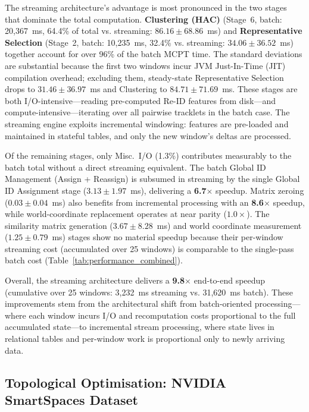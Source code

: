 \documentclass[review]{elsarticle}
\begin{document}
The streaming architecture's advantage is most pronounced in the two stages that dominate the total computation. \textbf{Clustering (HAC)} (Stage~6, batch: 20,367~ms, 64.4\% of total vs. streaming: $86.16 \pm 68.86$~ms) and \textbf{Representative Selection} (Stage~2, batch: 10,235~ms, 32.4\% vs. streaming: $34.06 \pm 36.52$~ms) together account for over 96\% of the batch MCPT time. The standard deviations are substantial because the first two windows incur JVM Just-In-Time (JIT) compilation overhead; excluding them, steady-state Representative Selection drops to $31.46 \pm 36.97$~ms and Clustering to $84.71 \pm 71.69$~ms. These stages are both I/O-intensive---reading pre-computed Re-ID features from disk---and compute-intensive---iterating over all pairwise tracklets in the batch case. The streaming engine exploits incremental windowing: features are pre-loaded and maintained in stateful tables, and only the new window's deltas are processed.

Of the remaining stages, only Misc.\ I/O (1.3\%) contributes measurably to the batch total without a direct streaming equivalent. The batch Global ID Management (Assign + Reassign) is subsumed in streaming by the single Global ID Assignment stage ($3.13 \pm 1.97$~ms), delivering a \textbf{6.7$\times$} speedup. Matrix zeroing ($0.03 \pm 0.04$~ms) also benefits from incremental processing with an \textbf{8.6$\times$} speedup, while world-coordinate replacement operates at near parity ($1.0\times$). The similarity matrix generation ($3.67 \pm 8.28$~ms) and world coordinate measurement ($1.25 \pm 0.79$~ms) stages show no material speedup because their per-window streaming cost (accumulated over 25 windows) is comparable to the single-pass batch cost
(Table~\ref{tab:performance_combined}).

Overall, the streaming architecture delivers a \textbf{9.8$\times$} end-to-end speedup (cumulative over 25 windows: 3,232~ms streaming vs. 31,620~ms batch). These improvements stem from the architectural shift from batch-oriented processing---where each window incurs I/O and recomputation costs proportional to the full accumulated state---to incremental stream processing, where state lives in relational tables and per-window work is proportional only to newly arriving data.

\subsection{Topological Optimisation: NVIDIA SmartSpaces Dataset}
\label{sec:eval:topology}
\end{document}

